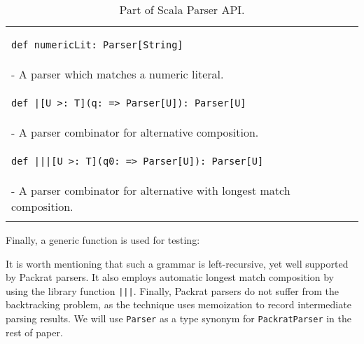 \begin{table}[t]
\begin{tabular}{l}
\hline
\begin{lstlisting}
def numericLit: Parser[String]
\end{lstlisting} \\
\hspace{.2in}- A parser which matches a numeric literal. \\
\hline
\begin{lstlisting}
def |[U >: T](q: => Parser[U]): Parser[U]
\end{lstlisting} \\
\hspace{.2in}- A parser combinator for alternative composition. \\
\hline
\begin{lstlisting}
def |||[U >: T](q0: => Parser[U]): Parser[U]
\end{lstlisting} \\
\hspace{.2in}- A parser combinator for alternative with longest match composition. \\
\hline \\
\end{tabular}
\caption{Part of Scala Parser API.}\label{tab:packrat}
\end{table}


Finally, a generic  function is used for testing:


It is worth mentioning that such a grammar is left-recursive, yet well supported by Packrat parsers. It also employs automatic
longest match composition by using the library function \lstinline{|||}. Finally, Packrat parsers do not suffer from the backtracking
problem, as the technique uses memoization to record intermediate parsing results. We will use \lstinline{Parser} as a type synonym for \lstinline{PackratParser} in the rest of paper.
